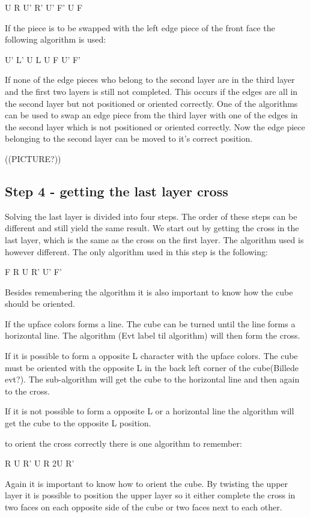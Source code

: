 U R U' R' U' F' U F

If the piece is to be swapped with the left edge piece of the front face the following algorithm is used:

U' L' U L U F U' F'

If none of the edge pieces who belong to the second layer are in the third layer and the first two layers is still not completed. This occurs if the edges are all in the second layer but not positioned or oriented correctly. One of the algorithms can be used to swap an edge piece from the third layer with one of the edges in the second layer which is not positioned or oriented correctly. Now the edge piece belonging to the second layer can be moved to it's correct position.

((PICTURE?))

\subsection{Step 4 - getting the last layer cross}
Solving the last layer is divided into four steps. The order of these steps can be different and still yield the same result. We start out by getting the cross in the last layer, which is the same as the cross on the first layer. The algorithm used is however different. The only algorithm used in this step is the following:

F R U R' U' F'

Besides remembering the algorithm it is also important to know how the cube should be oriented.

If the upface colors forms a line. The cube can be turned until the line forms a horizontal line. The algorithm (Evt label til algorithm) will then form the cross.

If it is possible to form a opposite L character with the upface colors. The cube must be oriented with the opposite L in the back left corner of the cube(Billede evt?). The sub-algorithm will get the cube to the horizontal line and then again to the cross.

If it is not possible to form a opposite L or a horizontal line the algorithm will get the cube to the opposite L position.

to orient the cross correctly there is one algorithm to remember:

R U R' U R 2U R' 

Again it is important to know how to orient the cube. By twisting the upper layer it is possible to position the upper layer so it either complete the cross in two faces on each opposite side of the cube or two faces next to each other.

